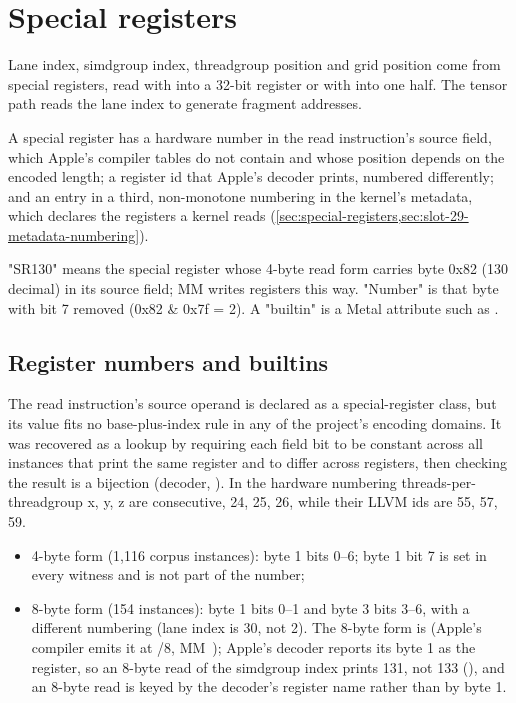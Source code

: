 \chapter{Special registers}\label{ch:special-registers}

Lane index, simdgroup index, threadgroup position and grid position come from special registers, read with
 into a 32-bit register or with  into one half. The tensor path reads the lane index to generate
fragment addresses.

A special register has a hardware number in the read instruction's source field, which Apple's compiler tables do not
contain and whose position depends on the encoded length; a register id that Apple's decoder prints, numbered
differently; and an entry in a third, non-monotone numbering in the kernel's metadata, which declares the registers a
kernel reads (\cref{sec:special-registers,sec:slot-29-metadata-numbering}).

"SR130" means the special register whose 4-byte read form carries byte 0x82 (130 decimal) in its
source field; MM writes registers this way. "Number" is that byte with bit 7 removed (0x82 \& 0x7f = 2). A "builtin" is a
Metal attribute such as .

\section{Register numbers and builtins}\label{sec:special-registers}

The read instruction's source operand is declared as a special-register
class, but its value fits no base-plus-index rule in any of the project's encoding domains. It was recovered as a lookup by
requiring each field bit to be constant across all instances that print the same register and to differ across registers,
then checking the result is a bijection (decoder, ). In the hardware
numbering threads-per-threadgroup x, y, z are consecutive, 24, 25, 26, while their LLVM ids are 55, 57, 59.

\begin{itemize}
\item 4-byte form (1,116 corpus instances): byte 1 bits 0–6; byte 1 bit 7 is set in every witness and is not part of the
  number;
\item 8-byte form (154 instances): byte 1 bits 0–1 and byte 3 bits 3–6, with a different numbering (lane index is 30, not 2).
  The 8-byte form is  (Apple's compiler emits it at /8, MM~); Apple's decoder
  reports its byte 1 as the register, so an 8-byte read of the simdgroup index prints 131, not 133 (),
  and an 8-byte read is keyed by the decoder's register name rather than by byte 1.
\end{itemize}

